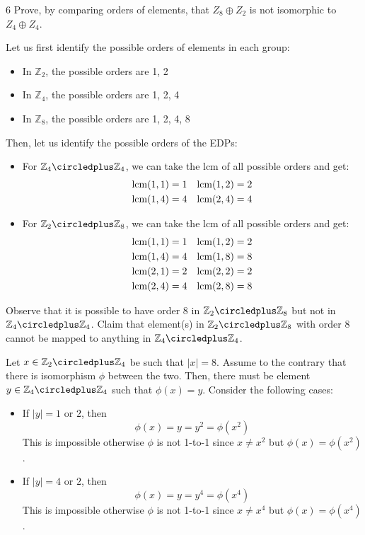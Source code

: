 \begin{hwproblem}
{6}{
    Prove, by comparing orders of elements, that $Z_8 \oplus Z_2$ is not isomorphic to $Z_4 \oplus Z_4$.
}

Let us first identify the possible orders of elements in each group:
\begin{itemize}
    \item In \(\mathbb{Z}_2\), the possible orders are 1, 2
    \item In \(\mathbb{Z}_4\), the possible orders are 1, 2, 4
    \item In \(\mathbb{Z}_8\), the possible orders are 1, 2, 4, 8
\end{itemize}
Then, let us identify the possible orders of the EDPs:
\begin{itemize}
    \item For \(\mathbb{Z}_4 \circledplus \mathbb{Z}_4\), we can take the lcm of all possible orders and get:
        \[
        \begin{aligned}
            \operatorname{lcm}(1, 1) &= 1 & \operatorname{lcm}(1, 2) &= 2 \\
            \operatorname{lcm}(1, 4) &= 4 & \operatorname{lcm}(2, 4) &= 4
        \end{aligned}
        \]
    \item For \(\mathbb{Z}_2 \circledplus \mathbb{Z}_8\), we can take the lcm of all possible orders and get:
        \[
        \begin{aligned}
            \operatorname{lcm}(1, 1) &= 1 & \operatorname{lcm}(1, 2) &= 2 \\
            \operatorname{lcm}(1, 4) &= 4 & \operatorname{lcm}(1, 8) &= 8 \\
            \operatorname{lcm}(2, 1) &= 2 & \operatorname{lcm}(2, 2) &= 2 \\
            \operatorname{lcm}(2, 4) &= 4 & \operatorname{lcm}(2, 8) &= 8
        \end{aligned}
        \]
\end{itemize}

Observe that it is possible to have order 8 in \(\mathbb{Z}_2 \circledplus \mathbb{Z}_8\) but not in \(\mathbb{Z}_4 \circledplus \mathbb{Z}_4\). Claim that element(s) in \(\mathbb{Z}_2 \circledplus \mathbb{Z}_8\) with order 8 cannot be mapped to anything in \(\mathbb{Z}_4 \circledplus \mathbb{Z}_4\).

Let \(x \in \mathbb{Z}_2 \circledplus \mathbb{Z}_4\) be such that \(|x| = 8\). Assume to the contrary that there is isomorphism \(\phi\) between the two. Then, there must be element \(y \in \mathbb{Z}_4 \circledplus \mathbb{Z}_4\) such that \(\phi(x) = y\). Consider the following cases:
\begin{itemize}
    \item If \(|y| = 1\) or \(2\), then
        \[
            \phi(x) = y = y^2 = \phi(x^2)
        \]
        This is impossible otherwise \(\phi\) is not 1-to-1 since \(x \neq x^2\) but \(\phi(x) = \phi(x^2)\).
    \item If \(|y| = 4\) or \(2\), then
        \[
            \phi(x) = y = y^4 = \phi(x^4)
        \]
        This is impossible otherwise \(\phi\) is not 1-to-1 since \(x \neq x^4\) but \(\phi(x) = \phi(x^4)\).
\end{itemize}


\end{hwproblem}
